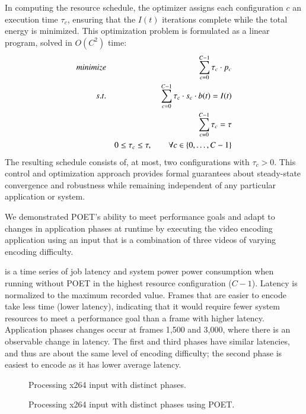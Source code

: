 In computing the resource schedule, the optimizer assigns each configuration $c$ an execution time $\tau_c$, ensuring that the $I(t)$ iterations complete while the total energy is minimized.
This optimization problem is formulated as a linear program, solved in $O(C^2)$ time:
\begin{eqnarray}
\minimize && \sum_{c=0}^{C-1} \tau_c \cdot p_c \label{eqn:poet-power} \\
\st %
&& \sum_{c=0}^{C-1} \tau_c \cdot s_c \cdot b(t) =  I(t) \label{eqn:poet-work} \\
&& \sum_{c=0}^{C-1} \tau_c =  \tau \label{eqn:poet-deadline} \\
&& 0 \le \tau_c \le \tau, \qquad \forall c \in \{0,\ldots,C-1\} \label{eqn:poet-time}
\end{eqnarray}
The resulting schedule consists of, at most, two configurations with $\tau_c > 0$.
This control and optimization approach provides formal guarantees about steady-state convergence and robustness while remaining independent of any particular application or system.

We demonstrated POET's ability to meet performance goals and adapt to changes in application phases at runtime by executing the  video encoding application using an input that is a combination of three videos of varying encoding difficulty.

 is a time series of job latency and system power power consumption when running  without POET in
the highest resource configuration ($C-1$).
Latency is normalized to the maximum recorded value.
Frames that are easier to encode take less time (lower latency), indicating that it would require fewer system resources to meet a performance goal than a frame with higher latency.
Application phases changes occur at frames 1,500 and 3,000, where there is an observable change in latency.
The first and third phases have similar latencies, and thus are about the same level of encoding difficulty; the second phase is easiest to encode as it has lower average latency.

\begin{figure}[t]
  
  \caption{Processing x264 input with distinct phases.}
  \label{fig:poet-phases-default}
\end{figure}
\begin{figure}[t]
      
  \caption{Processing x264 input with distinct phases using POET.}
  \label{fig:poet-phases-x264}
\end{figure}


